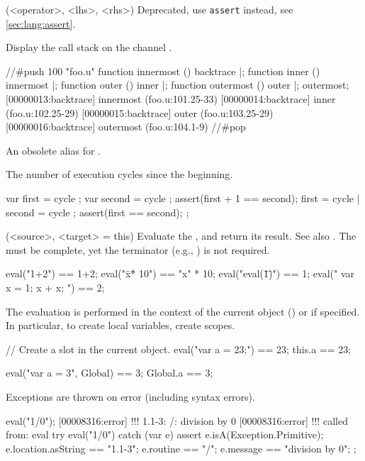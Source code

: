\begin{urbiscriptapi}
\item[assert_op](<operator>, <lhs>, <rhs>)%
  Deprecated, use \lstinline|assert| instead, see \autoref{sec:lang:assert}.


\item[backtrace]%
  Display the call stack on the channel . \experimental
\begin{urbiscript}
//#push 100 "foo.u"
function innermost () { backtrace }|;
function inner ()     { innermost }|;
function outer ()     { inner }|;
function outermost () { outer }|;
outermost;
[00000013:backtrace] innermost (foo.u:101.25-33)
[00000014:backtrace] inner (foo.u:102.25-29)
[00000015:backtrace] outer (foo.u:103.25-29)
[00000016:backtrace] outermost (foo.u:104.1-9)
//#pop
\end{urbiscript}




\item[currentRunner]  An obsolete alias for .

\item[cycle]%
  The number of execution cycles since the beginning. \experimental
\begin{urbiscript}
{
  var first = cycle ; var second = cycle ;
  assert(first + 1 == second);
  first = cycle | second = cycle ;
  assert(first == second);
};
\end{urbiscript}


\item[eval](<source>, <target> = this)%
  Evaluate the \us {}, and return its result.  See also
  .  The  must be complete, yet the terminator
  (e.g., \samp{;}) is not required.
\begin{urbiassert}
eval("1+2") == 1+2;
eval("\"x\" * 10") == "x" * 10;
eval("eval(\"1\")") == 1;
eval("{ var x = 1; x + x; }") == 2;
\end{urbiassert}

The evaluation is performed in the context of the current object (\this) or
 if specified.  In particular, to create local variables, create
scopes.
\begin{urbiassert}
// Create a slot in the current object.
eval("var a = 23;") == 23;
this.a == 23;

eval("var a = 3", Global) == 3;
Global.a == 3;
\end{urbiassert}

  Exceptions are thrown on error (including syntax errors).
\begin{urbiscript}
eval("1/0");
[00008316:error] !!! 1.1-3: /: division by 0
[00008316:error] !!!    called from: eval
try
{
  eval("1/0")
}
catch (var e)
{
  assert
  {
    e.isA(Exception.Primitive);
    e.location.asString  == "1.1-3";
    e.routine            == "/";
    e.message            == "division by 0";
  }
};
\end{urbiscript}


\end{urbiscriptapi}
